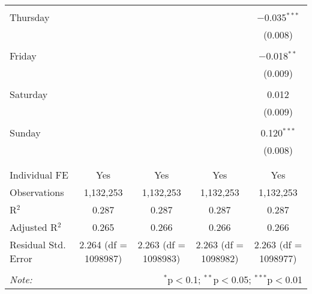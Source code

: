 \documentclass[
]{article}
\begin{document}
\begin{table}[!htbp]
{\begin{tabular}{@{\extracolsep{5pt}}lcccc}
  & & & & \\ 
 Thursday &  &  &  & $-$0.035$^{***}$ \\ 
  &  &  &  & (0.008) \\ 
  & & & & \\ 
 Friday &  &  &  & $-$0.018$^{**}$ \\ 
  &  &  &  & (0.009) \\ 
  & & & & \\ 
 Saturday &  &  &  & 0.012 \\ 
  &  &  &  & (0.009) \\ 
  & & & & \\ 
 Sunday &  &  &  & 0.120$^{***}$ \\ 
  &  &  &  & (0.008) \\ 
  & & & & \\ 
\hline \\[-1.8ex] 
Individual FE & Yes & Yes & Yes & Yes \\ 
Observations & 1,132,253 & 1,132,253 & 1,132,253 & 1,132,253 \\ 
R$^{2}$ & 0.287 & 0.287 & 0.287 & 0.287 \\ 
Adjusted R$^{2}$ & 0.265 & 0.266 & 0.266 & 0.266 \\ 
Residual Std. Error & 2.264 (df = 1098987) & 2.263 (df = 1098983) & 2.263 (df = 1098982) & 2.263 (df = 1098977) \\ 
\hline 
\hline \\[-1.8ex] 
\textit{Note:}  & \multicolumn{4}{r}{$^{*}$p$<$0.1; $^{**}$p$<$0.05; $^{***}$p$<$0.01} \\ 
\end{tabular}
} 
\end{table} 
\newpage
\end{document}
